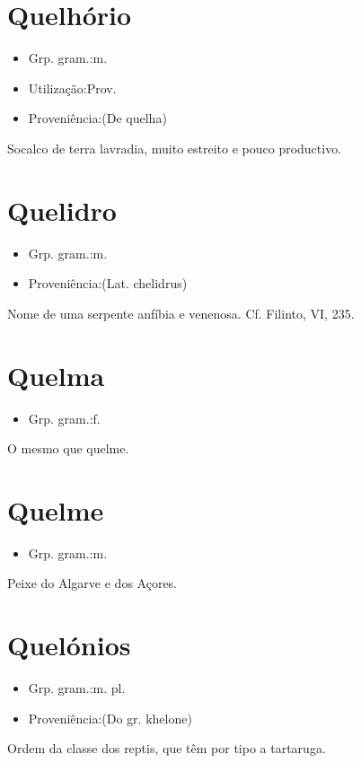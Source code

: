 \section{Quelhório}
\begin{itemize}
\item {Grp. gram.:m.}
\end{itemize}
\begin{itemize}
\item {Utilização:Prov.}
\end{itemize}
\begin{itemize}
\item {Proveniência:(De \textunderscore quelha\textunderscore )}
\end{itemize}
Socalco de terra lavradia, muito estreito e pouco productivo.
\section{Quelidro}
\begin{itemize}
\item {Grp. gram.:m.}
\end{itemize}
\begin{itemize}
\item {Proveniência:(Lat. \textunderscore chelidrus\textunderscore )}
\end{itemize}
Nome de uma serpente anfíbia e venenosa. Cf. Filinto, VI, 235.
\section{Quelma}
\begin{itemize}
\item {Grp. gram.:f.}
\end{itemize}
O mesmo que \textunderscore quelme\textunderscore .
\section{Quelme}
\begin{itemize}
\item {Grp. gram.:m.}
\end{itemize}
Peixe do Algarve e dos Açores.
\section{Quelónios}
\begin{itemize}
\item {Grp. gram.:m. pl.}
\end{itemize}
\begin{itemize}
\item {Proveniência:(Do gr. \textunderscore khelone\textunderscore )}
\end{itemize}
Ordem da classe dos reptis, que têm por tipo a tartaruga.
